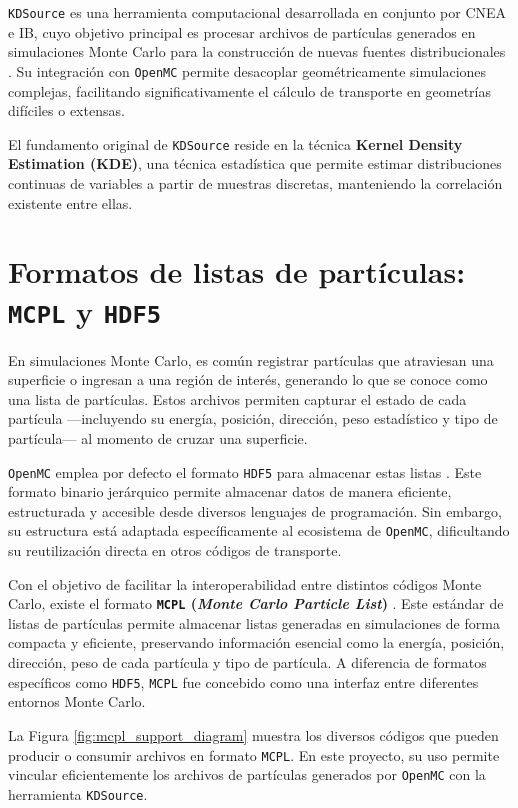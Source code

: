 \texttt{KDSource} es una herramienta computacional desarrollada en conjunto por CNEA e IB, cuyo objetivo principal es procesar archivos de partículas generados en simulaciones Monte Carlo para la construcción de nuevas fuentes distribucionales \cite{KDSource2024}. Su integración con \texttt{OpenMC} permite desacoplar geométricamente simulaciones complejas, facilitando significativamente el cálculo de transporte en geometrías difíciles o extensas.

El fundamento original de \texttt{KDSource} reside en la técnica \textbf{Kernel Density Estimation (KDE)}, una técnica estadística que permite estimar distribuciones continuas de variables a partir de muestras discretas, manteniendo la correlación existente entre ellas. 

\section{Formatos de listas de partículas: \texttt{MCPL} y \texttt{HDF5}}

En simulaciones Monte Carlo, es común registrar partículas que atraviesan una superficie o ingresan a una región de interés, generando lo que se conoce como una lista de partículas. Estos archivos permiten capturar el estado de cada partícula —incluyendo su energía, posición, dirección, peso estadístico y tipo de partícula— al momento de cruzar una superficie.

\texttt{OpenMC} emplea por defecto el formato \texttt{HDF5} para almacenar estas listas \cite{HDF5_2025}. Este formato binario jerárquico permite almacenar datos de manera eficiente, estructurada y accesible desde diversos lenguajes de programación. Sin embargo, su estructura está adaptada específicamente al ecosistema de \texttt{OpenMC}, dificultando su reutilización directa en otros códigos de transporte.

Con el objetivo de facilitar la interoperabilidad entre distintos códigos Monte Carlo, existe el formato \textbf{\texttt{MCPL} (\textit{Monte Carlo Particle List})} \cite{MCPL2024}. Este estándar de listas de partículas permite almacenar listas generadas en simulaciones de forma compacta y eficiente, preservando información esencial como la energía, posición, dirección, peso de cada partícula y tipo de partícula. A diferencia de formatos específicos como \texttt{HDF5}, \texttt{MCPL} fue concebido como una interfaz  entre diferentes entornos Monte Carlo.

La Figura \ref{fig:mcpl_support_diagram} muestra los diversos códigos que pueden producir o consumir archivos en formato \texttt{MCPL}. En este proyecto, su uso permite vincular eficientemente los archivos de partículas generados por \texttt{OpenMC} con la herramienta \texttt{KDSource}.

